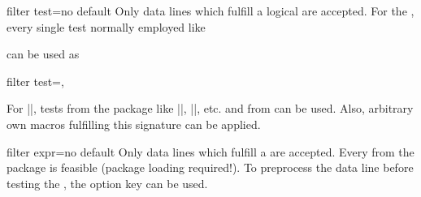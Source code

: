 \documentclass[a4paper,11pt]{ltxdoc}
\begin{document}
\begin{docCsvKey}[][doc new=2016-07-01]{filter test}{=}{no default}
  Only data lines which fulfill a logical  are accepted.
  For the , every single test normally employed like
\begin{dispListing}
\end{dispListing}
  can be used as
\begin{dispListing}
filter test=,
\end{dispListing}
  For |\iftest|, tests from the  package like
  |\ifnumcomp|, |\ifdimgreater|, etc. and from  can be used.
  Also, arbitrary own macros fulfilling this signature can be applied.
\begin{dispExample}
\end{dispExample}
\end{docCsvKey}


\medskip
\begin{docCsvKey}[][doc new=2016-07-01]{filter expr}{=}{no default}
  Only data lines which fulfill a  are accepted.
  Every 
  from the  package is feasible (package loading required!).
  To preprocess the data line before testing the ,
  the option key  can be used.
\begin{dispExample}
\end{dispExample}
\end{docCsvKey}
\end{document}
